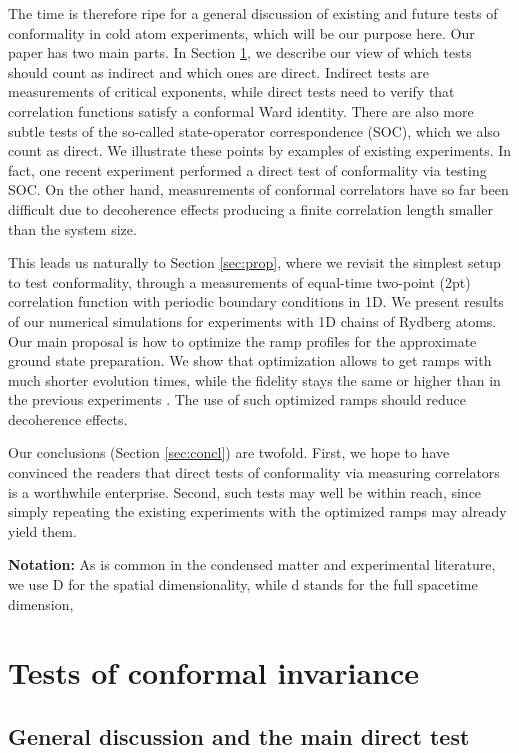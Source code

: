 \documentclass[a4paper,12pt]{article}
\theoremstyle{remark}
\theoremstyle{theorem}
\begin{document}
The time is therefore ripe for a general discussion of existing and future
tests of conformality in cold atom experiments, which will be our purpose
here. Our paper has two main parts. In Section \ref{sec:gen}, we
describe our view of which tests should count as indirect and which ones are
direct. Indirect tests are measurements of critical exponents, while direct
tests need to verify that correlation functions satisfy a conformal Ward
identity. There are also more subtle tests of the so-called state-operator correspondence (SOC), which we also count as direct.
We illustrate these points by examples of existing experiments. In fact, one recent experiment \cite{Sun:2026aqf} performed a direct test of conformality via testing SOC. On the other hand, measurements of conformal correlators have so far been difficult due to decoherence effects producing a finite correlation length smaller than the system size.

This leads us naturally to Section \ref{sec:prop}, where we revisit the simplest setup to test
conformality, through a measurements of equal-time two-point (2pt) correlation
function with periodic boundary conditions in 1D. We present results of
our numerical simulations for experiments with 1D chains of Rydberg atoms. Our main proposal is how to optimize the ramp profiles for the approximate ground state preparation. We show that optimization allows to get ramps with much shorter evolution times, while the fidelity stays the same or higher than in the previous experiments \cite{Fang:2024uyf}.  The use of such optimized ramps should reduce decoherence effects. 

Our conclusions (Section \ref{sec:concl}) are twofold. First, we hope to have convinced the readers that direct tests of conformality via measuring correlators is a worthwhile enterprise. Second, such tests may well be within reach, since simply repeating the existing experiments with the optimized ramps may already yield them.


{\bf Notation:} As is
common in the condensed matter and experimental literature, we use D for the spatial dimensionality, while d stands for the full spacetime dimension, 

\section{Tests of conformal invariance}\label{sec:gen}

\subsection{General discussion and the main direct test}
\end{document}
